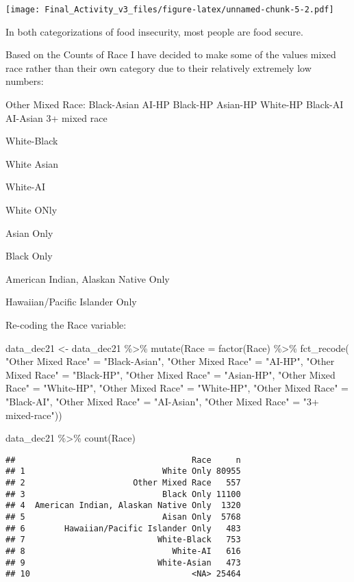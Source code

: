 \documentclass[
]{article}
\newenvironment{Shaded}{\begin{snugshade}}{\end{snugshade}}
\newcommand{\AttributeTok}[1]{\textcolor[rgb]{0.77,0.63,0.00}{#1}}
\newcommand{\FunctionTok}[1]{\textcolor[rgb]{0.00,0.00,0.00}{#1}}
\newcommand{\NormalTok}[1]{#1}
\newcommand{\OtherTok}[1]{\textcolor[rgb]{0.56,0.35,0.01}{#1}}
\newcommand{\SpecialCharTok}[1]{\textcolor[rgb]{0.00,0.00,0.00}{#1}}
\newcommand{\StringTok}[1]{\textcolor[rgb]{0.31,0.60,0.02}{#1}}
\begin{document}
\texttt{[image: Final\_Activity\_v3\_files/figure-latex/unnamed-chunk-5-2.pdf]}

In both categorizations of food insecurity, most people are food secure.

Based on the Counts of Race I have decided to make some of the values
mixed race rather than their own category due to their relatively
extremely low numbers:

Other Mixed Race: Black-Asian AI-HP Black-HP Asian-HP White-HP Black-AI
AI-Asian 3+ mixed race

White-Black

White Asian

White-AI

White ONly

Asian Only

Black Only

American Indian, Alaskan Native Only

Hawaiian/Pacific Islander Only

Re-coding the Race variable:

\begin{Shaded}
\begin{Highlighting}[]
\NormalTok{data\_dec21 }\OtherTok{\textless{}{-}}\NormalTok{ data\_dec21 }\SpecialCharTok{\%\textgreater{}\%} 
  \FunctionTok{mutate}\NormalTok{(}\AttributeTok{Race =} \FunctionTok{factor}\NormalTok{(Race) }\SpecialCharTok{\%\textgreater{}\%} 
    \FunctionTok{fct\_recode}\NormalTok{(}
      \StringTok{"Other Mixed Race"} \OtherTok{=} \StringTok{"Black{-}Asian"}\NormalTok{,}
      \StringTok{"Other Mixed Race"} \OtherTok{=} \StringTok{"AI{-}HP"}\NormalTok{,}
      \StringTok{"Other Mixed Race"} \OtherTok{=} \StringTok{"Black{-}HP"}\NormalTok{,}
      \StringTok{"Other Mixed Race"} \OtherTok{=} \StringTok{"Asian{-}HP"}\NormalTok{,}
      \StringTok{"Other Mixed Race"} \OtherTok{=} \StringTok{"White{-}HP"}\NormalTok{,}
      \StringTok{"Other Mixed Race"} \OtherTok{=} \StringTok{"White{-}HP"}\NormalTok{,}
      \StringTok{"Other Mixed Race"} \OtherTok{=} \StringTok{"Black{-}AI"}\NormalTok{,}
      \StringTok{"Other Mixed Race"} \OtherTok{=} \StringTok{"AI{-}Asian"}\NormalTok{,}
      \StringTok{"Other Mixed Race"} \OtherTok{=} \StringTok{"3+ mixed{-}race"}\NormalTok{))}


\NormalTok{data\_dec21 }\SpecialCharTok{\%\textgreater{}\%} \FunctionTok{count}\NormalTok{(Race)}
\end{Highlighting}
\end{Shaded}

\begin{verbatim}
##                                    Race     n
## 1                            White Only 80955
## 2                      Other Mixed Race   557
## 3                            Black Only 11100
## 4  American Indian, Alaskan Native Only  1320
## 5                            Aisan Only  5768
## 6        Hawaiian/Pacific Islander Only   483
## 7                           White-Black   753
## 8                              White-AI   616
## 9                           White-Asian   473
## 10                                 <NA> 25464
\end{verbatim}
\end{document}
